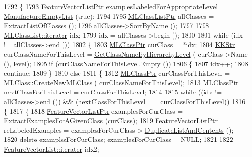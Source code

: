 \begin{DoxyCode}
1792 \{
1793   \hyperlink{class_k_k_m_l_l_1_1_feature_vector_list}{FeatureVectorListPtr}  examplesLabeledForAppropriateLevel = 
      \hyperlink{class_k_k_m_l_l_1_1_feature_vector_list_af533da1b34e4123f4fcb1343d5f48e37}{ManufactureEmptyList} (\textcolor{keyword}{true});
1794 
1795   \hyperlink{class_k_k_m_l_l_1_1_m_l_class_list}{MLClassListPtr}  allClasses = \hyperlink{class_k_k_m_l_l_1_1_feature_vector_list_af4bffa9713e7632b9e0e33f931528164}{ExtractListOfClasses} ();
1796   allClasses->\hyperlink{class_k_k_m_l_l_1_1_m_l_class_list_a00b4e0ed01e65ca7e6c21c285ea45c02}{SortByName} ();
1797 
1798   \hyperlink{class_k_k_b_1_1_k_k_queue_aa3c2796a726eea468b94132a9fbf2cfe}{MLClassList::iterator}  idx;
1799   idx = allClasses->begin ();
1800 
1801   \textcolor{keywordflow}{while}  (idx != allClasses->end ())
1802   \{
1803     \hyperlink{class_k_k_m_l_l_1_1_m_l_class}{MLClassPtr}  curClass = *idx;
1804     \hyperlink{class_k_k_b_1_1_k_k_str}{KKStr}  curClassNameForThisLevel = \hyperlink{_feature_vector_8cpp_ace90ab134408a31238bb04de83a3d1f2}{GetClassNameByHierarchyLevel} (
      curClass->Name (), level);
1805     \textcolor{keywordflow}{if}  (curClassNameForThisLevel.\hyperlink{class_k_k_b_1_1_k_k_str_ac69942f73fffd672ec2a6e1c410afdb6}{Empty} ())
1806     \{
1807       idx++;
1808       \textcolor{keywordflow}{continue};
1809     \}
1810     \textcolor{keywordflow}{else}
1811     \{
1812       \hyperlink{class_k_k_m_l_l_1_1_m_l_class}{MLClassPtr}  curClassForThisLevel  = \hyperlink{class_k_k_m_l_l_1_1_m_l_class_a9fd24c617c42d89afc92414575e00e9a}{MLClass::CreateNewMLClass} (
      curClassNameForThisLevel);
1813       \hyperlink{class_k_k_m_l_l_1_1_m_l_class}{MLClassPtr}  nextClassForThisLevel = curClassForThisLevel;
1814 
1815       \textcolor{keywordflow}{while}  ((idx != allClasses->end ())  &&  (nextClassForThisLevel == curClassForThisLevel))
1816       \{
1817         \{
1818           \hyperlink{class_k_k_m_l_l_1_1_feature_vector_list}{FeatureVectorListPtr}  examplesForCurClass = 
      \hyperlink{class_k_k_m_l_l_1_1_feature_vector_list_ab9c72c62046bf92e24e7e635d425792b}{ExtractExamplesForAGivenClass} (curClass);
1819           \hyperlink{class_k_k_m_l_l_1_1_feature_vector_list}{FeatureVectorListPtr}  reLabeledExamples = examplesForCurClass->
      \hyperlink{class_k_k_m_l_l_1_1_feature_vector_list_af14ad0946bbc6de8abdc4b513b6cf859}{DuplicateListAndContents} ();
1820           \textcolor{keyword}{delete}  examplesForCurClass;  examplesForCurClass = NULL;
1821 
1822           \hyperlink{class_k_k_b_1_1_k_k_queue_aa3c2796a726eea468b94132a9fbf2cfe}{FeatureVectorList::iterator}  idx2;

\end{DoxyCode}
